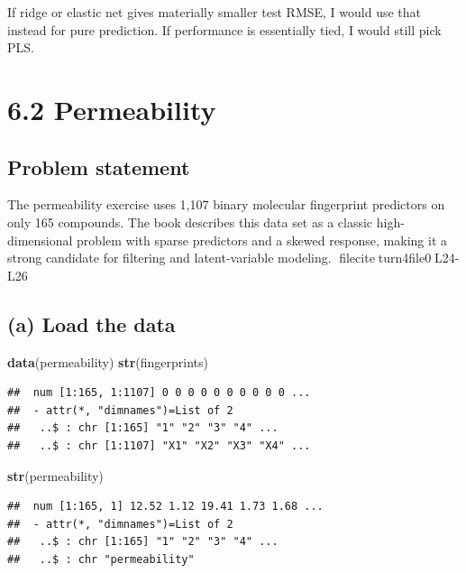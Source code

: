 \documentclass[
  11pt,
]{article}
\newenvironment{Shaded}{\begin{snugshade}}{\end{snugshade}}
\newcommand{\FunctionTok}[1]{\textcolor[rgb]{0.13,0.29,0.53}{\textbf{#1}}}
\newcommand{\NormalTok}[1]{#1}
\begin{document}
If ridge or elastic net gives materially smaller test RMSE, I would use
that instead for pure prediction. If performance is essentially tied, I
would still pick PLS.

\section{6.2 Permeability}\label{permeability}

\subsection{Problem statement}\label{problem-statement-1}

The permeability exercise uses 1,107 binary molecular fingerprint
predictors on only 165 compounds. The book describes this data set as a
classic high-dimensional problem with sparse predictors and a skewed
response, making it a strong candidate for filtering and latent-variable
modeling. fileciteturn4file0L24-L26

\subsection{(a) Load the data}\label{a-load-the-data-1}

\begin{Shaded}
\begin{Highlighting}[]
\FunctionTok{data}\NormalTok{(permeability)}
\FunctionTok{str}\NormalTok{(fingerprints)}
\end{Highlighting}
\end{Shaded}

\begin{verbatim}
##  num [1:165, 1:1107] 0 0 0 0 0 0 0 0 0 0 ...
##  - attr(*, "dimnames")=List of 2
##   ..$ : chr [1:165] "1" "2" "3" "4" ...
##   ..$ : chr [1:1107] "X1" "X2" "X3" "X4" ...
\end{verbatim}

\begin{Shaded}
\begin{Highlighting}[]
\FunctionTok{str}\NormalTok{(permeability)}
\end{Highlighting}
\end{Shaded}

\begin{verbatim}
##  num [1:165, 1] 12.52 1.12 19.41 1.73 1.68 ...
##  - attr(*, "dimnames")=List of 2
##   ..$ : chr [1:165] "1" "2" "3" "4" ...
##   ..$ : chr "permeability"
\end{verbatim}
\end{document}
